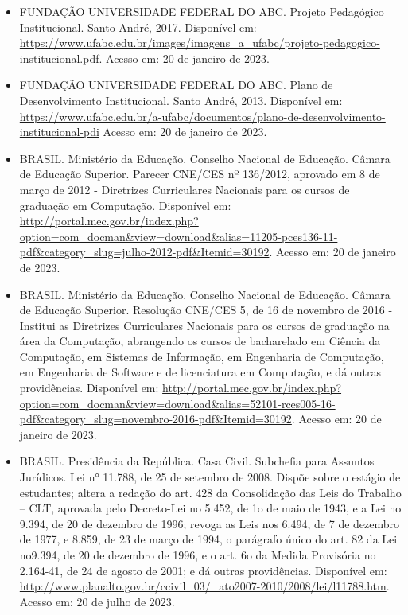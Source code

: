 \begin{itemize}
    \item FUNDAÇÃO UNIVERSIDADE FEDERAL DO ABC. Projeto Pedagógico Institucional. Santo
    André, 2017. Disponível em:
    \url{https://www.ufabc.edu.br/images/imagens_a_ufabc/projeto-pedagogico-institucional.pdf}.
    Acesso em: 20 de janeiro de 2023.
    
    \item FUNDAÇÃO UNIVERSIDADE FEDERAL DO ABC. Plano de Desenvolvimento
    Institucional. Santo André, 2013. Disponível em:
    \url{https://www.ufabc.edu.br/a-ufabc/documentos/plano-de-desenvolvimento-institucional-pdi}
    Acesso em: 20 de janeiro de 2023.
    
    \item BRASIL. Ministério da Educação. Conselho Nacional de Educação. Câmara
    de Educação Superior. Parecer CNE/CES nº 136/2012, aprovado em 8 de março
    de 2012 - Diretrizes Curriculares Nacionais para os cursos de graduação em
    Computação. 
    Disponível em: \url{http://portal.mec.gov.br/index.php?option=com_docman&view=download&alias=11205-pces136-11-pdf&category_slug=julho-2012-pdf&Itemid=30192}.
    Acesso em: 20 de janeiro de 2023.
    
    \item BRASIL. Ministério da Educação. Conselho Nacional de Educação. Câmara
    de Educação Superior. Resolução CNE/CES 5, de 16 de novembro de 2016 -
    Institui as Diretrizes Curriculares Nacionais para os cursos de graduação
    na área da Computação, abrangendo os cursos de bacharelado em Ciência da
    Computação, em Sistemas de Informação, em Engenharia de Computação, em
    Engenharia de Software e de licenciatura em Computação, e dá outras
    providências. Disponível em:
    \url{http://portal.mec.gov.br/index.php?option=com_docman&view=download&alias=52101-rces005-16-pdf&category_slug=novembro-2016-pdf&Itemid=30192}.
    Acesso em: 20 de janeiro de 2023.

    \item BRASIL. Presidência da República. Casa Civil. Subchefia para
    Assuntos Jurídicos. Lei n° 11.788, de 25 de setembro de
    2008. Dispõe sobre o estágio de estudantes; altera a redação do
    art. 428 da Consolidação das Leis do Trabalho – CLT, aprovada pelo
    Decreto-Lei no 5.452, de 1o de maio de 1943, e a Lei no 9.394, de
    20 de dezembro de 1996; revoga as Leis nos 6.494, de 7 de dezembro
    de 1977, e 8.859, de 23 de março de 1994, o parágrafo único do
    art. 82 da Lei no9.394, de 20 de dezembro de 1996, e o art. 6o da
    Medida Provisória no 2.164-41, de 24 de agosto de 2001; e dá
    outras providências. Disponível em:
    \url{http://www.planalto.gov.br/ccivil_03/_ato2007-2010/2008/lei/l11788.htm}.
    Acesso em: 20 de julho de 2023.


\end{itemize}
